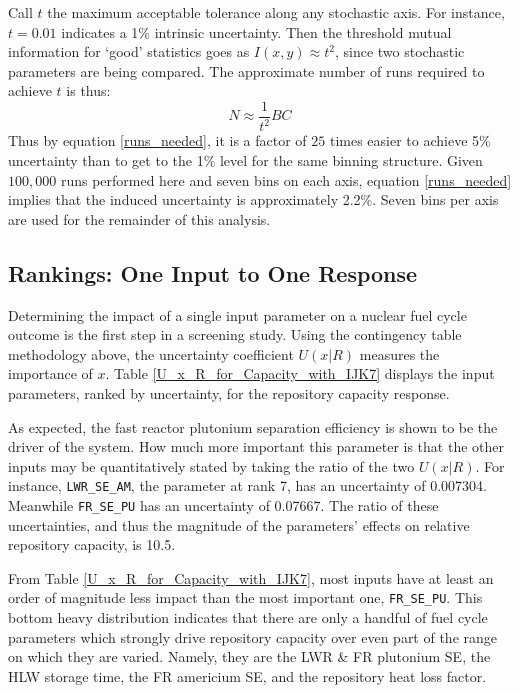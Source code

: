 Call $t$ the maximum acceptable tolerance along any stochastic axis.
For instance, $t = 0.01$ indicates a 1\% intrinsic uncertainty.
Then the threshold mutual information for `good' statistics goes as $I(x,y) \approx t^2$, since
two stochastic parameters are being compared.  The approximate number of runs required to achieve $t$ is thus:
\begin{equation}
\label{runs_needed}
N \approx \frac{1}{t^2} B C
\end{equation}
Thus by equation \ref{runs_needed}, it is a factor of $25$ times easier to achieve 5\% 
uncertainty than to get to the 1\% level for the same binning structure.
Given $100,000$ runs performed here and seven bins on each axis, equation \ref{runs_needed} implies
that the induced uncertainty is approximately 2.2\%.  Seven bins per axis are used for the 
remainder of this analysis.



\subsection{Rankings: One Input to One Response}
\label{cts_sec:rank2D}

Determining the impact of a single input parameter on a nuclear fuel cycle outcome is the 
first step in a screening study.  Using the contingency table methodology above,
the uncertainty coefficient $U(x|R)$ measures the importance of $x$.  
Table \ref{U_x_R_for_Capacity_with_IJK7} displays the input parameters, ranked by
uncertainty, for the repository capacity response.



As expected, the fast reactor plutonium separation efficiency is shown to be the 
driver of the system.  How much more important this parameter is that the
other inputs may be quantitatively stated by taking the ratio of the two $U(x|R)$.  
For instance, \texttt{LWR\_SE\_AM}, the parameter at rank 7,
has an uncertainty of 0.007304.  Meanwhile \texttt{FR\_SE\_PU} has an uncertainty 
of 0.07667.  The ratio of these uncertainties,
and thus the magnitude of the parameters' effects on relative repository capacity, is 10.5.

From Table \ref{U_x_R_for_Capacity_with_IJK7}, most inputs have at least an order of magnitude 
less impact than the most important one, \texttt{FR\_SE\_PU}.
This bottom heavy distribution indicates that there are only a handful of fuel cycle 
parameters which strongly drive
repository capacity over even part of the range on which they are varied.
Namely, they are the LWR \& FR plutonium SE, the HLW storage time, the FR americium SE, 
and the repository heat loss factor.

